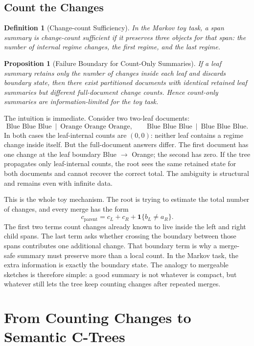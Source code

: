 \documentclass[11pt]{article}
\newtheorem{definition}{Definition}
\newtheorem{proposition}{Proposition}
\begin{document}
\subsection{Count the Changes}

\begin{definition}[Change-count Sufficiency]
In the Markov toy task, a span summary is change-count sufficient if it preserves three objects for that span: the number of internal regime changes, the first regime, and the last regime.
\end{definition}

\begin{proposition}[Failure Boundary for Count-Only Summaries]\label{prop:m_lt_k}
If a leaf summary retains only the number of changes inside each leaf and discards boundary state, then there exist partitioned documents with identical retained leaf summaries but different full-document change counts. Hence count-only summaries are information-limited for the toy task.
\end{proposition}

The intuition is immediate. Consider two two-leaf documents:
\[
\text{Blue Blue Blue}\ \mid\ \text{Orange Orange Orange},
\qquad
\text{Blue Blue Blue}\ \mid\ \text{Blue Blue Blue}.
\]
In both cases the leaf-internal counts are $(0,0)$: neither leaf contains a regime change inside itself. But the full-document answers differ. The first document has one change at the leaf boundary Blue $\rightarrow$ Orange; the second has zero. If the tree propagates only leaf-internal counts, the root sees the same retained state for both documents and cannot recover the correct total. The ambiguity is structural and remains even with infinite data.

This is the whole toy mechanism. The root is trying to estimate the total number of changes, and every merge has the form
\[
 c_{\mathrm{parent}} = c_L + c_R + \mathbf{1}\{b_L \neq a_R\}.
\]
The first two terms count changes already known to live inside the left and right child spans. The last term asks whether crossing the boundary between those spans contributes one additional change. That boundary term is why a merge-safe summary must preserve more than a local count. In the Markov task, the extra information is exactly the boundary state. The analogy to mergeable sketches is therefore simple: a good summary is not whatever is compact, but whatever still lets the tree keep counting changes after repeated merges.

\section{From Counting Changes to Semantic C-Trees}\label{sec:semantic-lift}
\end{document}

